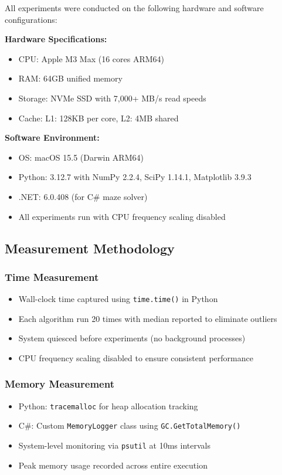 \documentclass[11pt]{article}
\theoremstyle{definition}
\begin{document}
All experiments were conducted on the following hardware and software configurations:

\textbf{Hardware Specifications:}
\begin{itemize}
\item CPU: Apple M3 Max (16 cores ARM64)
\item RAM: 64GB unified memory
\item Storage: NVMe SSD with 7,000+ MB/s read speeds
\item Cache: L1: 128KB per core, L2: 4MB shared
\end{itemize}

\textbf{Software Environment:}
\begin{itemize}
\item OS: macOS 15.5 (Darwin ARM64)
\item Python: 3.12.7 with NumPy 2.2.4, SciPy 1.14.1, Matplotlib 3.9.3
\item .NET: 6.0.408 (for C\# maze solver)
\item All experiments run with CPU frequency scaling disabled
\end{itemize}

\subsection{Measurement Methodology}

\subsubsection{Time Measurement}
\begin{itemize}
\item Wall-clock time captured using \texttt{time.time()} in Python
\item Each algorithm run 20 times with median reported to eliminate outliers
\item System quiesced before experiments (no background processes)
\item CPU frequency scaling disabled to ensure consistent performance
\end{itemize}

\subsubsection{Memory Measurement}
\begin{itemize}
\item Python: \texttt{tracemalloc} for heap allocation tracking
\item C\#: Custom \texttt{MemoryLogger} class using \texttt{GC.GetTotalMemory()}
\item System-level monitoring via \texttt{psutil} at 10ms intervals
\item Peak memory usage recorded across entire execution
\end{itemize}
\end{document}
